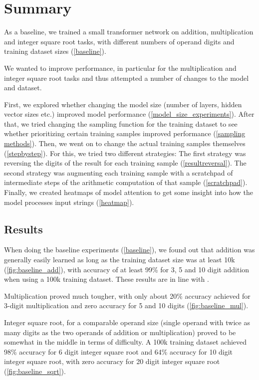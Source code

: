 \section{Summary}

As a baseline, we trained a small transformer network on addition, multiplication and integer square root tasks, with different numbers of operand digits and training dataset sizes (\cref{baseline}).

We wanted to improve performance, in particular for the multiplication and integer square root tasks and thus attempted a number of changes to the model and dataset.

First, we explored whether changing the model size (number of layers, hidden vector sizes etc.) improved model performance (\cref{model_size_experiments}).
After that, we tried changing the sampling function for the training dataset to see whether prioritizing certain training samples improved performance (\cref{sampling methods}).
Then, we went on to change the actual training samples themselves (\cref{stepbystep}). For this, we tried two different strategies:
The first strategy was reversing the digits of the result for each training sample (\cref{resultreversal}).
The second strategy was augmenting each training sample with a scratchpad of intermediate steps of the arithmetic computation of that sample (\cref{scratchpad}).
Finally, we created heatmaps of model attention to get some insight into how the model processes input strings (\cref{heatmap}).

\subsection{Results}
When doing the baseline experiments (\cref{baseline}), we found out that addition was generally easily learned as long as the training dataset size was at least 10k (\cref{fig:baseline_add}), with accuracy of at least 99\% for 3, 5 and 10 digit addition when using a 100k training dataset. These results are in line with \cite{teaching}.

Multiplication proved much tougher, with only about 20\% accuracy achieved for 3-digit multiplication and zero accuracy for 5 and 10 digits (\cref{fig:baseline_mul}).

Integer square root, for a comparable operand size (single operand with twice as many digits as the two operands of addition or multiplication) proved to be somewhat in the middle in terms of difficulty. A 100k training dataset achieved 98\% accuracy for 6 digit integer square root and 64\% accuracy for 10 digit integer square root, with zero accuracy for 20 digit integer square root (\cref{fig:baseline_sqrt}).

